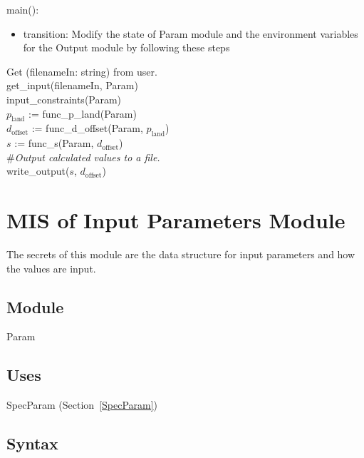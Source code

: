 \documentclass[12pt, titlepage]{article}
\begin{document}
\noindent main():
\begin{itemize}
\item transition: Modify the state of Param module and the environment variables
  for the Output module by following these steps\\
\end{itemize}

\noindent Get (filenameIn: string) from user.\\
\noindent get\_input(filenameIn, Param)\\
\noindent input\_constraints(Param)\\
\noindent $p_{\text{land}}$ := func\_p\_land(Param)\\
\noindent $d_{\text{offset}}$ := func\_d\_offset(Param, $p_{\text{land}}$)\\
\noindent $s$ := func\_s(Param, $d_{\text{offset}}$)\\
\noindent \#\textit{Output calculated values to a file.}\\
\noindent write\_output($s$, $d_{\text{offset}}$)\\

\newpage

\section{MIS of Input Parameters Module} \label{Parameters}

The secrets of this module are the data structure for input parameters and how 
the values are input.

\subsection{Module}

Param

\subsection{Uses}

SpecParam (Section~\ref{SpecParam})

\subsection{Syntax}
\end{document}
